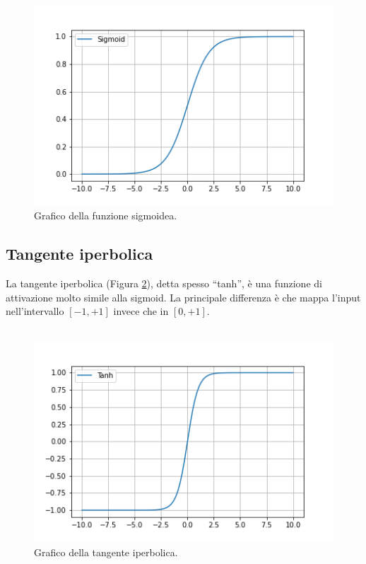 \begin{figure}[h!]
  \hspace*{0.9in}
  \includegraphics[scale=0.6]{img/sigmoid.png}
  \caption{Grafico della funzione sigmoidea.}
  \label{fig:sigmoid}
\end{figure}

\subsection{Tangente iperbolica}
La tangente iperbolica (Figura \ref{fig:tanh}), detta spesso “tanh”, è una funzione di attivazione molto simile alla sigmoid. La principale differenza è che mappa l’input nell’intervallo $[-1, +1]$ invece che in $[0, +1]$.\\ \\


\begin{figure}[h!]
  \hspace*{0.9in}
  \includegraphics[scale=0.6]{img/tanh.png}
  \caption{Grafico della tangente iperbolica.}
  \label{fig:tanh}
\end{figure}










